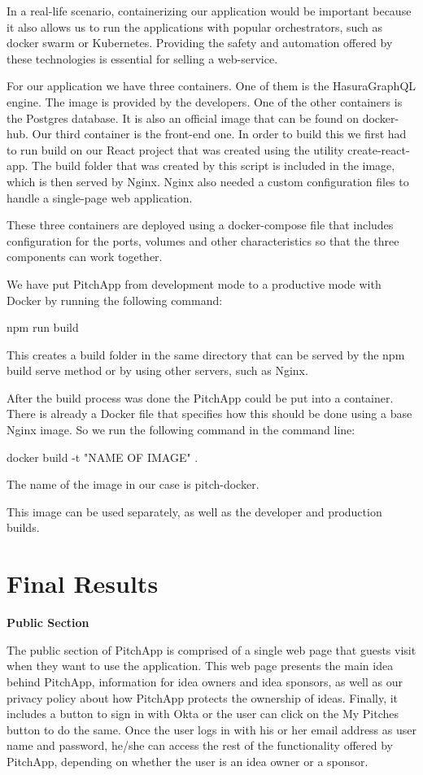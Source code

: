 In a real-life scenario, containerizing our application would be important because it also allows us to run the applications with popular orchestrators, such as docker swarm or Kubernetes. Providing the safety and automation offered by these technologies is essential for selling a web-service.

For our application we have three containers. One of them is the HasuraGraphQL engine. The image is provided by the developers. One of the other containers is the Postgres database. It is also an official image that can be found on docker-hub. Our third container is the front-end one. In order to build this we first had to run build on our React project that was created using the utility create-react-app. The build folder that was created by this script is included in the image, which is then served by Nginx. Nginx also needed a custom configuration files to handle a single-page web application.

These three containers are deployed using a docker-compose file that includes configuration for the ports, volumes and other characteristics so that the three components can work together.

We have put PitchApp from development mode to a productive mode with Docker by running the following command:

npm run build

This creates a build folder in the same directory that can be served by the npm build serve method or by using other servers, such as Nginx.

After the build process was done the PitchApp could be put into a container. There is already a Docker file that specifies how this should be done using a base Nginx image. So we run the following command in the command line:

docker build -t "NAME OF IMAGE" .

The name of the image in our case is pitch-docker.

This image can be used separately, as well as the developer and production builds.


\chapter{Final Results}


\textbf{Public Section}

The public section of PitchApp is comprised of a single web page that guests visit when they want to use the application. This web page presents the main idea behind PitchApp, information for idea owners and idea sponsors, as well as our privacy policy about how PitchApp protects the ownership of ideas. Finally, it includes a button to sign in with Okta or the user can click on the My Pitches button to do the same. Once the user logs in with his or her email address as user name and password, he/she can access the rest of the functionality offered by PitchApp, depending on whether the user is an idea owner or a sponsor.

